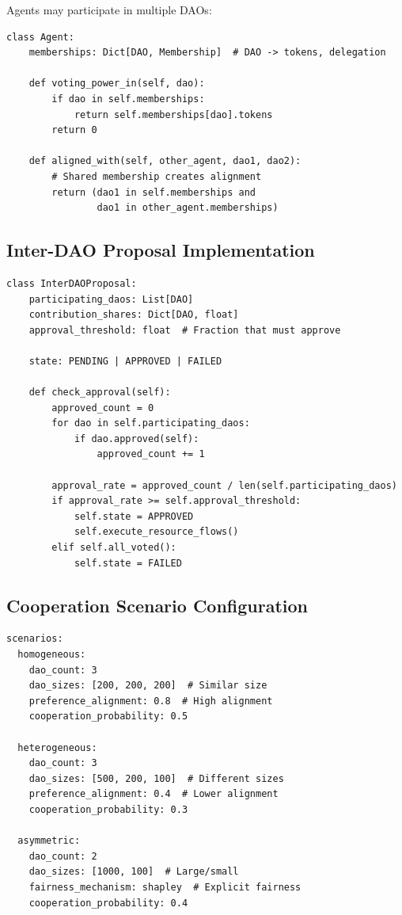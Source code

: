 Agents may participate in multiple DAOs:

\begin{lstlisting}[caption=Multi-DAO agent model (pseudocode)]
class Agent:
    memberships: Dict[DAO, Membership]  # DAO -> tokens, delegation

    def voting_power_in(self, dao):
        if dao in self.memberships:
            return self.memberships[dao].tokens
        return 0

    def aligned_with(self, other_agent, dao1, dao2):
        # Shared membership creates alignment
        return (dao1 in self.memberships and
                dao1 in other_agent.memberships)
\end{lstlisting}

\subsection{Inter-DAO Proposal Implementation}

\begin{lstlisting}[caption=Inter-DAO proposal (pseudocode)]
class InterDAOProposal:
    participating_daos: List[DAO]
    contribution_shares: Dict[DAO, float]
    approval_threshold: float  # Fraction that must approve

    state: PENDING | APPROVED | FAILED

    def check_approval(self):
        approved_count = 0
        for dao in self.participating_daos:
            if dao.approved(self):
                approved_count += 1

        approval_rate = approved_count / len(self.participating_daos)
        if approval_rate >= self.approval_threshold:
            self.state = APPROVED
            self.execute_resource_flows()
        elif self.all_voted():
            self.state = FAILED
\end{lstlisting}

\subsection{Cooperation Scenario Configuration}

\begin{lstlisting}[caption=Cooperation scenario configuration]
scenarios:
  homogeneous:
    dao_count: 3
    dao_sizes: [200, 200, 200]  # Similar size
    preference_alignment: 0.8  # High alignment
    cooperation_probability: 0.5

  heterogeneous:
    dao_count: 3
    dao_sizes: [500, 200, 100]  # Different sizes
    preference_alignment: 0.4  # Lower alignment
    cooperation_probability: 0.3

  asymmetric:
    dao_count: 2
    dao_sizes: [1000, 100]  # Large/small
    fairness_mechanism: shapley  # Explicit fairness
    cooperation_probability: 0.4
\end{lstlisting}

